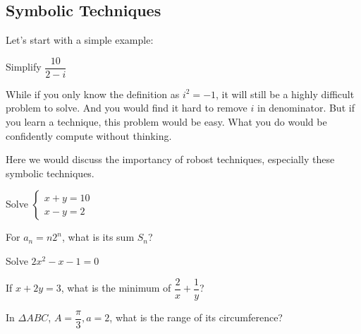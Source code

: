 \subsection{Symbolic Techniques}

Let's start with a simple example:

\begin{example}
  Simplify $\dfrac{10}{2- i}$
\end{example}

While if you only know the definition as $i^2 = -1$, it will still be a highly difficult problem to solve. And you would find it hard to remove $i$ in denominator. But if you learn a technique, this problem would be easy. What you do would be confidently compute without thinking.

Here we would discuss the importancy of robost techniques, especially these symbolic techniques.



\begin{example}
  Solve $\begin{cases}
  x + y = 10 \\
  x - y = 2
\end{cases}$
\end{example}

\begin{example}
  For $a_n = n2^n$, what is its sum $S_n$?
\end{example}

\begin{example}
  Solve $2x^2 - x - 1 = 0$
\end{example}

\begin{example}
  If $x + 2y = 3$, what is the minimum of $\dfrac{2}{x} + \dfrac{1}{y}$?
\end{example}

\begin{example}
  In $\Delta ABC$, $A = \dfrac{\pi}{3}, a = 2$, what is the range of its circumference?
\end{example}
